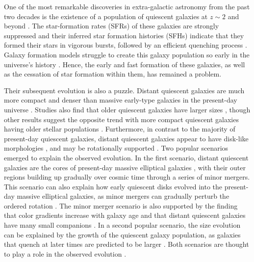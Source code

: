 \documentclass[twocolumn, astrosymb]{aastex631}
\begin{document}
One of the most remarkable discoveries in extra-galactic astronomy from the past two decades is the existence of a population of quiescent galaxies at $z\sim2$ and beyond \citep[e.g.,][]{MFranx2003,ACimatti2004,EDaddi2005,MKriek2006,CStraatman2014,KGlazebrook2017,CSchreiber2018,MTanaka2019, BForrest2020a,BForrest2020b, JEsdaile2021,FValentino2023,JAntwi-Danso2023,ACarnall2023a,ACarnall2023b, KGlazebrook2023, TNanayakkara2024}. The star-formation rates (SFRs) of these galaxies are strongly suppressed and their inferred star formation histories (SFHs) indicate that they formed their stars in vigorous bursts, followed by an efficient quenching process \citep[e.g.,][]{MKriek2016,ACarnall2019,MJafariyazani2020,BForrest2020a,BForrest2020b,FValentino2020,ABeverage2024}. Galaxy formation models struggle to create this galaxy population so early in the universe's history \citep[e.g.,][]{CSchreiber2018, RCecchi2019, AHartley2023, KGould2023, EWeller2024}. Hence, the early and fast formation of these galaxies, as well as the cessation of star formation within them, has remained a problem.

Their subsequent evolution is also a puzzle. Distant quiescent galaxies are much more compact and denser than massive early-type galaxies in the present-day universe \citep[e.g.,][]{EDaddi2005,PvanDokkum2008,AvanderWel2014,KSuess2019a,KSuess2021}. Studies also find that older quiescent galaxies have larger sizes \citep{KWhitaker2012,MYano2016,OAlmaini2017,KSuess2020}, though other results suggest the opposite trend with more compact quiescent galaxies having older stellar populations \citep{AGargiulo2017,PFWu2018,MHamadouche2022}. Furthermore, in contrast to the majority of present-day quiescent galaxies, distant quiescent galaxies appear to have disk-like morphologies \citep[][]{AvanderWel2011, YChang2013}, and may be rotationally supported \citep[][]{SToft2017,ANewman2018b,FDEugenio2023}. Two popular scenarios emerged to explain the observed evolution. In the first scenario, distant quiescent galaxies are the cores of present-day massive elliptical galaxies  \citep[e.g.,][]{TNaab2009,RBezanson2009,PvanDokkum2010}, with their outer regions building up gradually over cosmic time through a series of minor mergers. This scenario can also explain how early quiescent disks evolved into the present-day massive elliptical galaxies, as minor mergers can gradually perturb the ordered rotation \citep{FBournaud2007,TNaab2014,CLagos2018}. The minor merger scenario is also supported by the finding that color gradients increase with galaxy age \citep[][]{KSuess2020} and that distant quiescent galaxies have many small companions \citep{ANewman2012,KSuess2023}. In a second popular scenario, the size evolution can be explained by the growth of the quiescent galaxy population, as galaxies that quench at later times are predicted to be larger \citep[i.e., progenitor bias; e.g.,][]{SKhochfar2006,BPoggianti2013,MCarollo2013,ZJi2022}. Both scenarios are thought to play a role in the observed evolution \citep[e.g.,][]{SBelli2017}.
\end{document}
